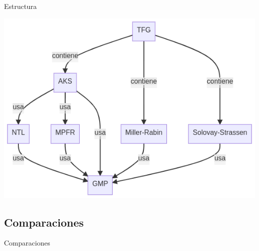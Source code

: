 \documentclass{beamer}
\begin{document}
\begin{frame}{Estructura}
	\begin{alertblock}{}
		\begin{center}
			\includegraphics[scale=0.40]{../Memoria/img/diagrama-relaciones}
		\end{center}
	\end{alertblock}
\end{frame}

\subsection{Comparaciones}

\begin{frame}
	\begin{Large}
		Comparaciones
	\end{Large}
\end{frame}
\end{document}
